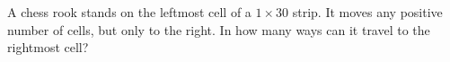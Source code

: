 A chess rook stands on the leftmost cell of a $1\times30$ strip. It moves any positive number of cells, but only to the right. In how many ways can it travel to the rightmost cell?
